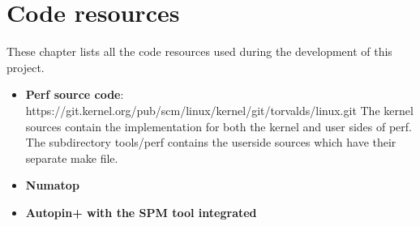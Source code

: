 \chapter{Code resources}\label{app:coderes}

These chapter lists all the code resources used during the development of this project.

\begin{itemize}
	\item \textbf{Perf source code}: https://git.kernel.org/pub/scm/linux/kernel/git/torvalds/linux.git The kernel sources contain the implementation for both the kernel and user sides of perf. The subdirectory tools/perf contains the userside sources which have their separate make file.
	\item \textbf{Numatop}
	\item \textbf{Autopin+ with the SPM tool integrated}
\end{itemize}